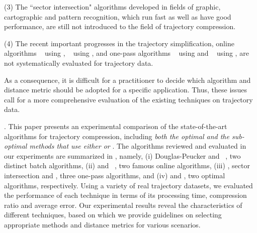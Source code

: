 \ni (3) The ``sector intersection" algorithms \cite{Williams:Longest, Sklansky:Cone, Dunham:Cone, Zhao:Sleeve} developed in fields of graphic, cartographic and pattern recognition, which run fast as well as have good performance, are still not introduced to the field of trajectory compression.

\ni (4) The recent important progresses in the trajectory simplification, \ie online algorithms \squishe~\cite{Muckell:Compression} using \sed, \bqsa~\cite{Liu:BQS} using \ped, and one-pass algorithms \operb~\cite{Lin:Operb} using \ped and \cised~\cite{Lin:Cised} using \sed, are not systematically evaluated for trajectory data. 


As a consequence, it is difficult for a practitioner to decide which algorithm and distance metric should be adopted for a specific application. 
Thus, these issues call for a more comprehensive evaluation of the existing \lsa techniques on trajectory data.

.
This paper presents an experimental comparison of the state-of-the-art \lsa algorithms for trajectory compression, including \emph{both the optimal and the sub-optimal methods that use either \ped or \sed}. 
The algorithms reviewed and evaluated in our experiments are summarized in , namely,
(i) Douglas-Peucker\cite{Douglas:Peucker,Meratnia:Spatiotemporal} and \pavlidis~\cite{Pavlidis:Segment}, two distinct batch \lsa algorithms,
(ii) \bqsa\cite{Liu:BQS} and \squishe~\cite{Muckell:SQUISH}, two famous online \lsa algorithms,
(iii) \operb\cite{Lin:Operb}, sector intersection \cite{Williams:Longest,Sklansky:Cone,Dunham:Cone, Zhao:Sleeve} and \cised \cite{Lin:Cised}, three one-pass \lsa algorithms, and
(iv) \oped\cite{Chan:Optimal} and \osed, two optimal \lsa algorithms, respectively.
%
%
Using a variety of real trajectory datasets, we evaluated the performance of each technique in terms of its processing time, compression ratio and average error.
Our experimental results reveal the characteristics of different techniques, based on which we provide guidelines on selecting appropriate methods and distance metrics for various scenarios.




